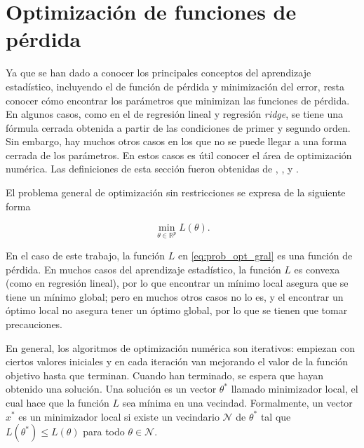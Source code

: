 






\section{Optimización de funciones de pérdida}

Ya que se han dado a conocer los principales conceptos del aprendizaje estadístico, incluyendo el de función de pérdida y minimización del error, resta conocer cómo encontrar los parámetros que minimizan las funciones de pérdida. En algunos casos, como en el de regresión lineal y regresión \textit{ridge}, se tiene una fórmula cerrada obtenida a partir de las condiciones de primer y segundo orden. Sin embargo, hay muchos otros casos en los que no se puede llegar a una forma cerrada de los parámetros. En estos casos es útil conocer el área de optimización numérica. Las definiciones de esta sección fueron obtenidas de \cite{1606.04838}, \cite{johnson2013accelerating}, \cite{nocedal2006numerical} y \cite{roux2012stochastic}.

El problema general de optimización sin restricciones se expresa de la siguiente forma

\begin{equation}
  \label{eq:prob_opt_gral}
  \min_{\theta \in \mathbb{R}^p} L(\theta).
\end{equation}

En el caso de este trabajo, la función $L$ en \ref{eq:prob_opt_gral} es una función de pérdida. En muchos casos del aprendizaje estadístico, la función $L$ es convexa (como en regresión lineal), por lo que encontrar un mínimo local asegura que se tiene un mínimo global; pero en muchos otros casos no lo es, y el encontrar un óptimo local no asegura tener un óptimo global, por lo que se tienen que tomar precauciones.

En general, los algoritmos de optimización numérica son iterativos: empiezan con ciertos valores iniciales y en cada iteración van mejorando el valor de la función objetivo hasta que terminan. Cuando han terminado, se espera que hayan obtenido una solución. Una solución es un vector $\theta^*$ llamado minimizador local, el cual hace que la función $L$ sea mínima en una vecindad. Formalmente, un vector $x^*$ es un minimizador local si existe un vecindario $\mathcal{N}$ de $\theta^*$ tal que $L(\theta^*) \leq L(\theta)$ para todo $\theta \in \mathcal{N}$.

